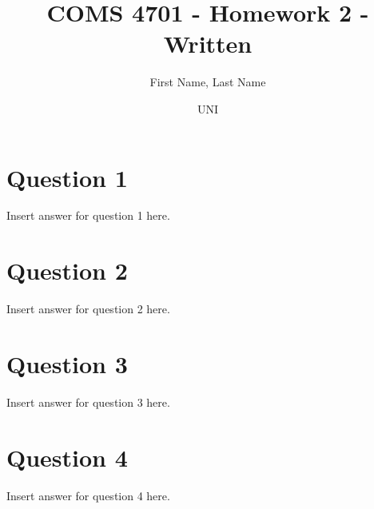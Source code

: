 \documentclass{article}
\title{COMS 4701 - Homework 2 - Written}
\author
{
First Name, Last Name
\and UNI
}
\begin{document}
    \maketitle

    \section*{Question 1}
    Insert answer for question 1 here.
    \newpage
    \section*{Question 2}
    Insert answer for question 2 here.
    \newpage
    \section*{Question 3}
    Insert answer for question 3 here.
    \newpage
    \section*{Question 4}
    Insert answer for question 4 here.
\end{document}
